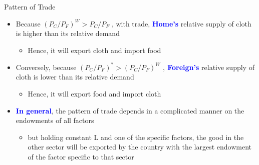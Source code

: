\documentclass[10pt,hyperref={CJKbookmarks=true},xcolor=dvipsnames,aspectratio=169]{beamer}
\begin{document}
\begin{frame}{Pattern of Trade}

\begin{itemize}
\item Because $(P_{C}/P_{F})^{W}>P_{C}/P_{F}$ , with trade, \textbf{\textcolor{blue}{Home’s}}
relative supply of cloth is higher than its relative demand 

\begin{itemize}
\item Hence, it will export cloth and import food 
\end{itemize}
\item Conversely, because $(P_{C}/P_{F})^{*}>(P_{C}/P_{F})^{W}$ ,\textbf{\textcolor{blue}{{}
Foreign’s}} relative supply of cloth is lower than its relative demand 

\begin{itemize}
\item Hence, it will export food and import cloth 
\end{itemize}
\item \textbf{\textcolor{blue}{In general}}, the pattern of trade depends
in a complicated manner on the endowments of all factors 

\begin{itemize}
\item but holding constant L and one of the specific factors, the good in
the other sector will be exported by the country with the largest
endowment of the factor specific to that sector 
\end{itemize}
\end{itemize}
\end{frame}
\end{document}
